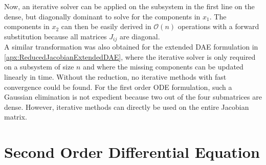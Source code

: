 Now, an iterative solver can be applied on the subsystem in the first line on the dense, but diagonally dominant to solve for the components in $x_1$. The components in $x_2$ can then be easily derived in $\mathcal{O}(n)$ operations with a forward substitution because all matrices $J_{ij}$ are diagonal. \\
A similar transformation was also obtained for the extended DAE formulation in \autoref{apx:ReducedJacobianExtendedDAE}, where the iterative solver is only required on a subsystem of size $n$ and where the missing components can be updated linearly in time. Without the reduction, no iterative methods with fast convergence could be found. For the first order ODE formulation, such a Gaussian elimination is not expedient because two out of the four submatrices are dense. However, iterative methods can directly be used on the entire Jacobian matrix.


\section{Second Order Differential Equation}
\label{sec:44mul4SEAS__2ndOrderODE}

